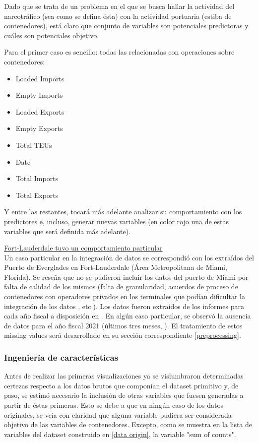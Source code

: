 \documentclass[12pt]{article}
\begin{document}
		Dado que se trata de un problema en el que se busca hallar la actividad del narcotráfico (sea como se defina ésta) con la actividad portuaria (estiba de contenedores), está claro que conjunto de variables son potenciales predictoras y cuáles son potenciales objetivo.
		
		Para el primer caso es sencillo: todas las relacionadas con operaciones sobre contenedores: 
		\begin{itemize}
			\item Loaded Imports
			\item Empty Imports
			\item Loaded Exports
			\item Empty Exports
			\item Total TEUs
			\item Date
			\item Total Imports
			\item Total Exports
		\end{itemize}
	
		Y entre las restantes, tocará más adelante analizar su comportamiento con los predictores e, incluso, generar nuevas variables (en color rojo una de estas variables que será definida más adelante).
		
		\underline{Fort-Lauderdale tuvo un comportamiento particular}\\
		Un caso particular en la integración de datos se correspondió con los extraídos del Puerto de Everglades en Fort-Lauderdale (Área Metropolitana de Miami, Florida). Se reseña que no se pudieron incluir los datos del puerto de Miami por falta de calidad de los mismos (falta de granularidad, acuerdos de proceso de contenedores con operadores privados en los terminales que podían dificultar la integración de los datos \cite{portmiami2025cargo}, etc.). Los datos fueron extraídos de los informes para cada año fiscal a disposición en \cite{porteverglades2025stats}. En algún caso particular, se observó la ausencia de datos para el año fiscal 2021 (últimos tres meses, \cite{porteverglades2021teus}). El tratamiento de estos missing values será desarrollado en su sección correspondiente \ref{preprocessing}.
		
		\subsubsection{\label{feature engineering}Ingeniería de características}
		Antes de realizar las primeras visualizaciones ya se vislumbraron determinadas certezas respecto a los datos brutos que componían el dataset primitivo y, de paso, se estimó necesario la inclusión de otras variables que fuesen generadas a partir de éstas primeras.
		Esto se debe a que en ningún caso de los datos originales, se veía con claridad que alguna variable pudiera ser considerada objetivo de las variables de contenedores. Excepto, como se muestra en la lista de variables del dataset construido en \ref{data origin}, la variable "sum of counts". 
		
\end{document}
